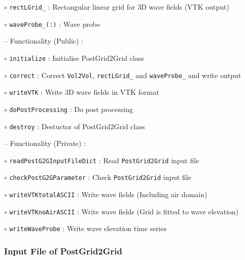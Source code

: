 	\hspace{1.0 cm} $\circ$ \texttt{rectLGrid\_} : Rectangular linear grid for 3D wave fields (VTK output)
	
	\hspace{1.0 cm} $\circ$ \texttt{waveProbe\_(:)} : Wave probe 
	
	\vspace{0.5cm}
	
	\hspace{0.5 cm} -- Functionality (Public) :
	
	\hspace{1.0 cm} $\circ$ \texttt{initialize} : Initialise PostGrid2Grid class
	
	\hspace{1.0 cm} $\circ$ \texttt{correct} : Correct \texttt{Vol2Vol}, \texttt{rectLGrid\_} and \texttt{waveProbe\_} and write output
	
	\hspace{1.0 cm} $\circ$ \texttt{writeVTK} : Write 3D wave fields in VTK format
	
	\hspace{1.0 cm} $\circ$ \texttt{doPostProcessing} : Do post processing 
	
	\hspace{1.0 cm} $\circ$ \texttt{destroy} : Destuctor of PostGrid2Grid class
	
	\vspace{0.5cm}
	
	\hspace{0.5 cm} -- Functionality (Private) :
	
	\hspace{1.0 cm} $\circ$ \texttt{readPostG2GInputFileDict} : Read \texttt{PostGrid2Grid} input file
	
	\hspace{1.0 cm} $\circ$ \texttt{checkPostG2GParameter} : Check \texttt{PostGrid2Grid} input file
	
	\hspace{1.0 cm} $\circ$ \texttt{writeVTKtotalASCII} : Write wave fields (Including air domain)
	
	\hspace{1.0 cm} $\circ$ \texttt{writeVTKnoAirASCII} : Write wave fields (Grid is fitted to wave elevation)
	
	\hspace{1.0 cm} $\circ$ \texttt{writeWaveProbe} : Write wave elevation time series
	
	\pagebreak
	\subsubsection{Input File of PostGrid2Grid}
	
